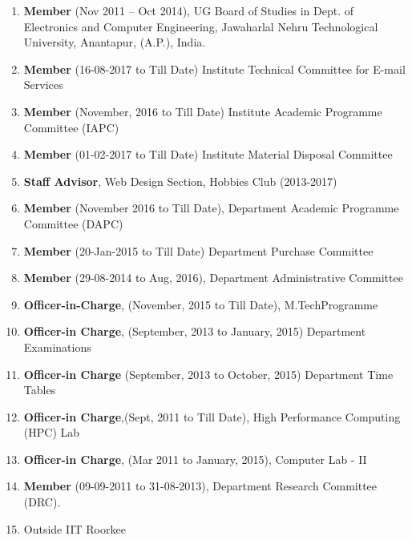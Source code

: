 \begin{enumerate}


\item
\textbf{Member} (Nov 2011 – Oct 2014), UG Board of Studies in Dept. of Electronics and Computer Engineering, Jawaharlal Nehru Technological University, Anantapur, (A.P.), India.

\item
\textbf{Member} (16-08-2017 to Till Date) Institute Technical Committee for E-mail Services

\item
\textbf{Member }(November, 2016 to Till Date) Institute Academic Programme Committee (IAPC)

\item
\textbf{Member} (01-02-2017 to Till Date) Institute Material Disposal Committee

\item 
\textbf{Staff Advisor}, Web Design Section, Hobbies Club (2013-2017)

\item
\textbf{Member} (November 2016 to Till Date), Department Academic Programme Committee (DAPC)

\item
\textbf{Member} (20-Jan-2015 to Till Date) Department Purchase Committee

\item
\textbf{Member} (29-08-2014 to Aug, 2016), Department Administrative Committee

\item
\textbf{Officer-in-Charge}, (November, 2015 to Till Date), M.TechProgramme

\item
\textbf{Officer-in Charge}, (September, 2013 to January, 2015) Department Examinations

\item
\textbf{Officer-in Charge }(September, 2013 to October, 2015) Department Time Tables

\item
\textbf{Officer-in Charge},(Sept, 2011 to Till Date), High Performance Computing (HPC) Lab 

\item
\textbf{Officer-in Charge}, (Mar 2011 to January, 2015), Computer Lab - II

\item
\textbf{Member} (09-09-2011 to 31-08-2013), Department Research Committee (DRC).

\item
Outside IIT Roorkee


\end{enumerate}
